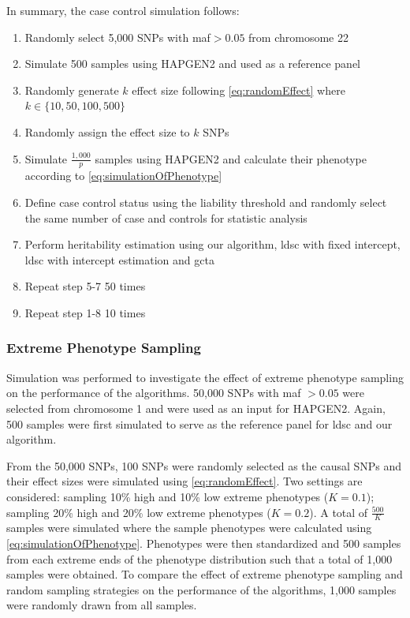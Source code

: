 		In summary, the case control simulation follows:
		\begin{enumerate}
			\item Randomly select 5,000 \glspl{SNP} with \gls{maf}$>0.05$ from chromosome 22
			\item Simulate 500 samples using HAPGEN2 and used as a reference panel
			\item Randomly generate $k$ effect size following \cref{eq:randomEffect} where $k\in\{10,50,100,500\}$
			\item Randomly assign the effect size to $k$ \glspl{SNP}
			\item Simulate $\frac{1,000}{p}$ samples using HAPGEN2 and calculate their phenotype according to \cref{eq:simulationOfPhenotype}
			\item Define case control status using the liability threshold and randomly select the same number of case and controls for statistic analysis
			\item Perform heritability estimation using our algorithm, \gls{ldsc} with fixed intercept, \gls{ldsc} with intercept estimation and \gls{gcta}
			\item Repeat step 5-7 50 times
			\item Repeat step 1-8 10 times
		\end{enumerate}
		
		\subsubsection{Extreme Phenotype Sampling}
		Simulation was performed to investigate the effect of extreme phenotype sampling on the performance of the algorithms.
		50,000 \glspl{SNP} with \gls{maf} $>0.05$ were selected from chromosome 1 and were used as an input for HAPGEN2.
		Again, 500 samples were first simulated to serve as the reference panel for \gls{ldsc} and our algorithm.
		
		From the 50,000 \glspl{SNP}, 100 \glspl{SNP} were randomly selected as the causal \glspl{SNP} and their effect sizes were simulated using \cref{eq:randomEffect}.
		Two settings are considered: sampling 10\% high and 10\% low extreme phenotypes ($K=0.1$); sampling 20\% high and 20\% low extreme phenotypes ($K=0.2$).
		A total of $\frac{500}{K}$ samples were simulated where the sample phenotypes were calculated using \cref{eq:simulationOfPhenotype}.
		Phenotypes were then standardized and 500 samples from each extreme ends of the phenotype distribution such that a total of 1,000 samples were obtained. 
		To compare the effect of extreme phenotype sampling and random sampling strategies on the performance of the algorithms, 1,000 samples were randomly drawn from all samples.
		

